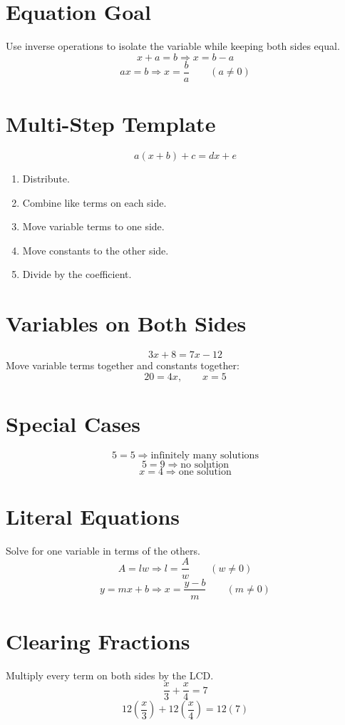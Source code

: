 \documentclass[11pt]{article}
\begin{document}

\section*{Equation Goal}
Use inverse operations to isolate the variable while keeping both sides equal.
\[
x+a=b \Rightarrow x=b-a
\]
\[
ax=b \Rightarrow x=\frac{b}{a}\qquad (a\ne0)
\]

\section*{Multi-Step Template}
\[
a(x+b)+c=dx+e
\]
\begin{enumerate}
  \item Distribute.
  \item Combine like terms on each side.
  \item Move variable terms to one side.
  \item Move constants to the other side.
  \item Divide by the coefficient.
\end{enumerate}

\section*{Variables on Both Sides}
\[
3x+8=7x-12
\]
Move variable terms together and constants together:
\[
20=4x,\qquad x=5
\]

\section*{Special Cases}
\[
5=5 \Rightarrow \text{infinitely many solutions}
\]
\[
5=9 \Rightarrow \text{no solution}
\]
\[
x=4 \Rightarrow \text{one solution}
\]

\section*{Literal Equations}
Solve for one variable in terms of the others.
\[
A=lw \Rightarrow l=\frac{A}{w}\qquad (w\ne0)
\]
\[
y=mx+b \Rightarrow x=\frac{y-b}{m}\qquad (m\ne0)
\]

\section*{Clearing Fractions}
Multiply every term on both sides by the LCD.
\[
\frac{x}{3}+\frac{x}{4}=7
\]
\[
12\left(\frac{x}{3}\right)+12\left(\frac{x}{4}\right)=12(7)
\]
\end{document}

